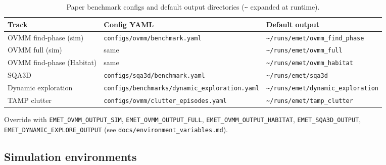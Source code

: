 \begin{table}[t]
  \centering
  \caption{Paper benchmark configs and default output directories (\texttt{\textasciitilde} expanded at runtime).}
  \label{tab:benchmark_configs}
  \small
  \begin{tabular}{@{}lll@{}}
    \toprule
    Track & Config YAML & Default output \\
    \midrule
    OVMM find-phase (sim) & \texttt{configs/ovmm/benchmark.yaml} & \texttt{\textasciitilde/runs/emet/ovmm\_find\_phase} \\
    OVMM full (sim) & same & \texttt{\textasciitilde/runs/emet/ovmm\_full} \\
    OVMM find-phase (Habitat) & same & \texttt{\textasciitilde/runs/emet/ovmm\_habitat} \\
    SQA3D & \texttt{configs/sqa3d/benchmark.yaml} & \texttt{\textasciitilde/runs/emet/sqa3d} \\
    Dynamic exploration & \texttt{configs/benchmarks/dynamic\_exploration.yaml} & \texttt{\textasciitilde/runs/emet/dynamic\_exploration} \\
    TAMP clutter & \texttt{configs/ovmm/clutter\_episodes.yaml} & \texttt{\textasciitilde/runs/emet/tamp\_clutter} \\
    \bottomrule
  \end{tabular}
\end{table}

Override with \texttt{EMET\_OVMM\_OUTPUT\_SIM}, \texttt{EMET\_OVMM\_OUTPUT\_FULL}, \texttt{EMET\_OVMM\_OUTPUT\_HABITAT}, \texttt{EMET\_SQA3D\_OUTPUT}, \texttt{EMET\_DYNAMIC\_EXPLORE\_OUTPUT} (see \texttt{docs/environment\_variables.md}).

\subsection{Simulation environments}

